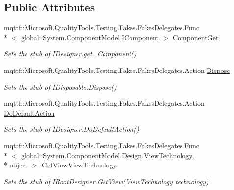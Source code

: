 \subsection*{Public Attributes}
\begin{DoxyCompactItemize}
\item 
mqttf\-::\-Microsoft.\-Quality\-Tools.\-Testing.\-Fakes.\-Fakes\-Delegates.\-Func\\*
$<$ global\-::\-System.\-Component\-Model.\-I\-Component $>$ \hyperlink{class_system_1_1_component_model_1_1_design_1_1_fakes_1_1_stub_i_root_designer_aad2f98c6e3f69699f37c06aaeeef6b47}{Component\-Get}
\begin{DoxyCompactList}\small\item\em Sets the stub of I\-Designer.\-get\-\_\-\-Component()\end{DoxyCompactList}\item 
mqttf\-::\-Microsoft.\-Quality\-Tools.\-Testing.\-Fakes.\-Fakes\-Delegates.\-Action \hyperlink{class_system_1_1_component_model_1_1_design_1_1_fakes_1_1_stub_i_root_designer_adf48568d7b8c29d6cab3ad5554011afc}{Dispose}
\begin{DoxyCompactList}\small\item\em Sets the stub of I\-Disposable.\-Dispose()\end{DoxyCompactList}\item 
mqttf\-::\-Microsoft.\-Quality\-Tools.\-Testing.\-Fakes.\-Fakes\-Delegates.\-Action \hyperlink{class_system_1_1_component_model_1_1_design_1_1_fakes_1_1_stub_i_root_designer_aefa690667d69fd2b29d478061278787a}{Do\-Default\-Action}
\begin{DoxyCompactList}\small\item\em Sets the stub of I\-Designer.\-Do\-Default\-Action()\end{DoxyCompactList}\item 
mqttf\-::\-Microsoft.\-Quality\-Tools.\-Testing.\-Fakes.\-Fakes\-Delegates.\-Func\\*
$<$ global\-::\-System.\-Component\-Model.\-Design.\-View\-Technology, \\*
object $>$ \hyperlink{class_system_1_1_component_model_1_1_design_1_1_fakes_1_1_stub_i_root_designer_a5acef1b228e6d2b1a75b8c52c7bd778d}{Get\-View\-View\-Technology}
\begin{DoxyCompactList}\small\item\em Sets the stub of I\-Root\-Designer.\-Get\-View(\-View\-Technology technology)\end{DoxyCompactList}\item 

\end{DoxyCompactItemize}
